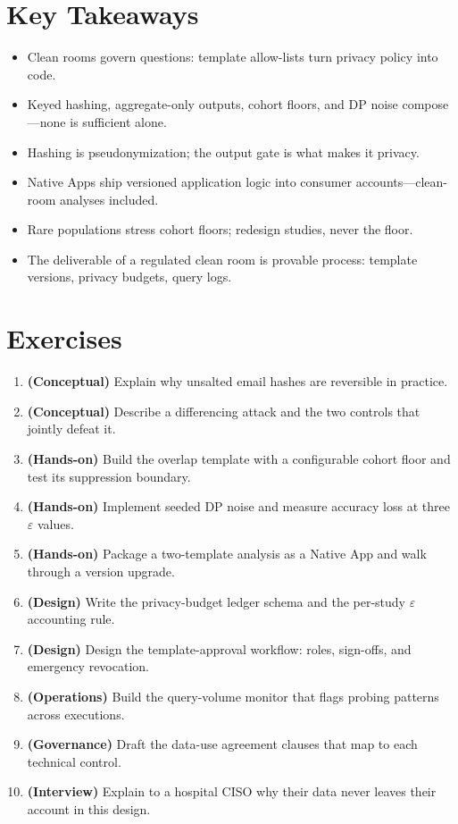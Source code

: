 \section*{Key Takeaways}
\begin{itemize}
    \item Clean rooms govern questions: template allow-lists turn privacy policy into code.
    \item Keyed hashing, aggregate-only outputs, cohort floors, and DP noise compose---none is sufficient alone.
    \item Hashing is pseudonymization; the output gate is what makes it privacy.
    \item Native Apps ship versioned application logic into consumer accounts---clean-room analyses included.
    \item Rare populations stress cohort floors; redesign studies, never the floor.
    \item The deliverable of a regulated clean room is provable process: template versions, privacy budgets, query logs.
\end{itemize}

\section{Exercises}
\begin{enumerate}
    \item \textbf{(Conceptual)} Explain why unsalted email hashes are reversible in practice.
    \item \textbf{(Conceptual)} Describe a differencing attack and the two controls that jointly defeat it.
    \item \textbf{(Hands-on)} Build the overlap template with a configurable cohort floor and test its suppression boundary.
    \item \textbf{(Hands-on)} Implement seeded DP noise and measure accuracy loss at three $\varepsilon$ values.
    \item \textbf{(Hands-on)} Package a two-template analysis as a Native App and walk through a version upgrade.
    \item \textbf{(Design)} Write the privacy-budget ledger schema and the per-study $\varepsilon$ accounting rule.
    \item \textbf{(Design)} Design the template-approval workflow: roles, sign-offs, and emergency revocation.
    \item \textbf{(Operations)} Build the query-volume monitor that flags probing patterns across executions.
    \item \textbf{(Governance)} Draft the data-use agreement clauses that map to each technical control.
    \item \textbf{(Interview)} Explain to a hospital CISO why their data never leaves their account in this design.
\end{enumerate}


